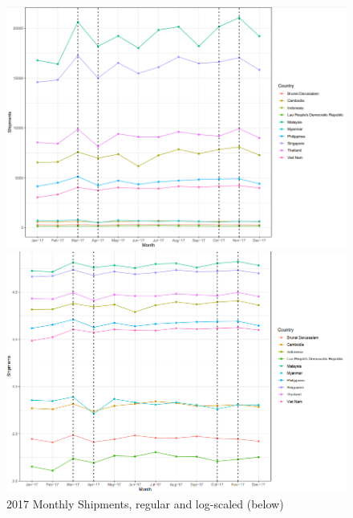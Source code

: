 \documentclass{article}
\begin{document}
\begin{figure}[H]
    \begin{minipage}[c]{1\linewidth}
        \includegraphics[width=\linewidth]{images/Line Plots/Seasonal/2017_seasonal.png}
    \end{minipage}
    \hfill
    \begin{minipage}[c]{1\linewidth}
        \includegraphics[width=\linewidth]{images/Line Plots/Seasonal/2017_seasonal_log.png}
        \caption{2017 Monthly Shipments, regular and log-scaled (below)}
    \end{minipage}
\end{figure}
\end{document}
